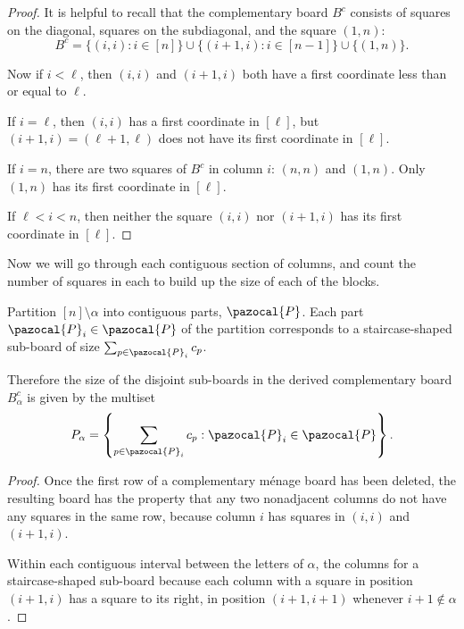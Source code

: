 \begin{proof}
  It is helpful to recall that the complementary board $B^c$ consists of squares
  on the diagonal, squares on the subdiagonal, and the square $(1, n)$:
  \begin{equation}
    B^c = \{(i, i) : i \in [n]\} \cup \{(i + 1, i) : i \in [n-1]\} \cup \{(1,n)\}.
  \end{equation}

  Now if $i < \ell$, then $(i,i)$ and $(i + 1, i)$ both have a first coordinate
  less than or equal to $\ell$.

  If $i = \ell$, then $(i, i)$ has a first coordinate in $[\ell]$, but
  $(i + 1, i) = (\ell + 1, \ell)$ does not have its first coordinate in $[\ell]$.

  If $i = n$, there are two squares of $B^c$ in column $i$: $(n, n)$ and $(1, n)$.
  Only $(1,n)$ has its first coordinate in $[\ell]$.

  If $\ell < i < n$, then neither the square $(i, i)$ nor $(i+1, i)$ has
  its first coordinate in $[\ell]$.
\end{proof}

Now we will go through each contiguous section of columns, and count the number
of squares in each to build up the size of each of the blocks.

\begin{lemma}
  Partition $[n] \setminus \alpha$ into contiguous parts, $\pazocal{P}$.
  Each part $\pazocal{P}_i \in \pazocal{P}$ of the partition corresponds to a staircase-shaped
  sub-board of size $\sum_{p \in \pazocal{P}_i} c_p$.

  Therefore the size of the disjoint sub-boards in the derived complementary
  board $B_\alpha^c$ is given by the multiset \begin{equation}
    P_\alpha = \left\{ \sum_{p \in \pazocal{P}_i} c_p : \pazocal{P}_i \in \pazocal{P} \right\}.
  \end{equation}
\label{lem:subBoardSizes}
\end{lemma}

\begin{proof}
  Once the first row of a complementary m\'enage board has been deleted,
  the resulting board has the property that any two nonadjacent columns
  do not have any squares in the same row, because column $i$ has
  squares in $(i, i)$ and $(i+1, i)$.

  Within each contiguous interval between the letters of $\alpha$,
  the columns for a staircase-shaped sub-board because
  each column with a square in position $(i + 1, i)$ has a square to its right,
  in position $(i + 1, i + 1)$ whenever $i + 1 \not\in \alpha$.
\end{proof}

